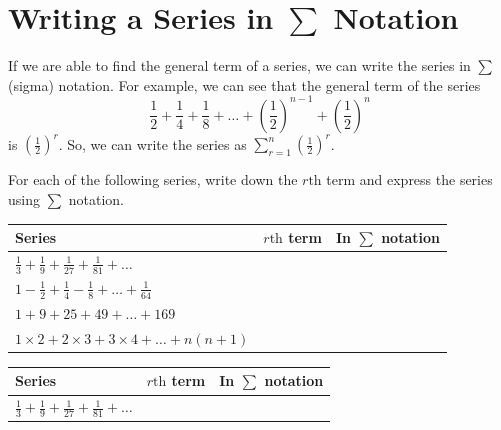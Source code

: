 \documentclass[11pt,a4paper]{book}
\begin{document}
\newpage

\section{Writing a Series in $\sum$ Notation}

If we are able to find the general term of a series, we can write
the series in $\sum$ (sigma) notation. For example, we can see that
the general term of the series
\[
\frac{1}{2}+\frac{1}{4}+\frac{1}{8}+\ldots+\left(\frac{1}{2}\right)^{n-1}+\left(\frac{1}{2}\right)^{n}
\]
 is ${\displaystyle \left(\frac{1}{2}\right)^{r}}$. So, we can write
the series as ${\displaystyle \sum_{r=1}^{n}\left(\frac{1}{2}\right)^{r}}$.

\begin{example}

For each of the following series, write down the $r\text{th}$ term
and express the series using $\sum$ notation.

\bigskip

\setlength{\extrarowheight}{12pt}

\begin{tabular}{|>{\centering}p{7cm}|>{\centering}p{3cm}|>{\centering}p{3cm}|}
\hline
Series

\medskip{} & $r\text{th}$ term & In $\sum$ notation\tabularnewline
\hline
${\displaystyle \frac{1}{3}+\frac{1}{9}+\frac{1}{27}+\frac{1}{81}}+\ldots$

\medskip{} &  & \tabularnewline
\hline
${\displaystyle 1-\frac{1}{2}+\frac{1}{4}-\frac{1}{8}+\ldots+\frac{1}{64}}$

\medskip{} &  & \tabularnewline
\hline
$1+9+25+49+\ldots+169$

\medskip{} &  & \tabularnewline
\hline
$1\times2+2\times3+3\times4+\ldots+n\left(n+1\right)$

\medskip{} &  & \tabularnewline
\hline
\end{tabular}

\bigskip

\Solution

\medskip

\setlength{\extrarowheight}{12pt}

\begin{tabular}{|>{\centering}p{7cm}|>{\centering}p{3cm}|>{\centering}p{3cm}|}
\hline
Series

\medskip{} & $r\text{th}$ term & In $\sum$ notation\tabularnewline
\hline
${\displaystyle \frac{1}{3}+\frac{1}{9}+\frac{1}{27}+\frac{1}{81}}+\ldots$


\end{tabular}
\end{example}
\end{document}
